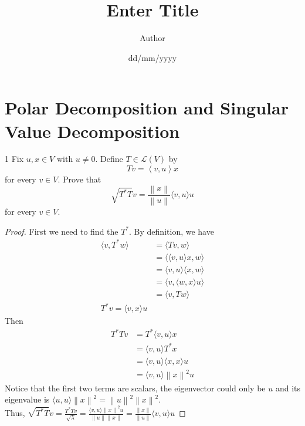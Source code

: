 \documentclass{article}
\title{\vspace{-2em}Enter Title}
\author{Author}
\date{dd/mm/yyyy}
\newenvironment{problem}[1]{\begin{prob*}{#1}{}}{\end{prob*}}
\begin{document}
\maketitle

\newpage
\tableofcontents
\newpage

\section{Polar Decomposition and Singular Value Decomposition}

\begin{problem}{1}
	Fix $u, x \in V$ with $u \neq 0$. Define $T \in \mathcal{L}(V)$ by \[
		Tv = \left< v, u \right> x
	\]
	for every $v \in V$. Prove that \[
		\sqrt{T^* T}v = \frac{\left\| x \right\|}{\left\| u \right\|} \langle v , u \rangle u
	\] for every $v \in V$.
\end{problem}
\begin{proof}
  First we need to find the $T^*$. By definition, we have
	\begin{equation*}
		\begin{aligned}
			\langle v , T^*w \rangle &= \langle Tv , w \rangle \\
			&= \langle \langle v , u \rangle x , w \rangle \\
			&= \langle v , u \rangle \langle x , w \rangle \\
			&= \langle v , \langle w , x \rangle u \rangle \\
			&= \langle v , Tw \rangle \\
			T^* v = \langle v , x \rangle u
		\end{aligned}
	\end{equation*}
	Then \begin{equation*}
		\begin{aligned}
		 T^*T v &= T^* \langle v , u \rangle x \\
		 &= \langle v , u \rangle T^* x \\
		 &= \langle v , u \rangle \langle x , x \rangle u \\
		 &= \langle v , u \rangle \left\| x \right\|^{2} u
		\end{aligned}
	\end{equation*}
	Notice that the first two terms are scalars,
	the eigenvector could only be $u$ and its eigenvalue
	is $\langle u , u \rangle \left\| x \right\|^{2} = \left\| u \right\|^{2} \left\| x \right\|^{2}$. \\
	Thus, $\sqrt{T^*T}v = \frac{T^*T v}{\sqrt{\lambda}} = \frac{\langle v , u \rangle\left\| x \right\|^{2} u}{\left\| u \right\|\left\| x \right\|}
	= \frac{\left\| x \right\|}{\left\| u \right\|}\langle v , u \rangle u $
\end{proof}

\end{document}
